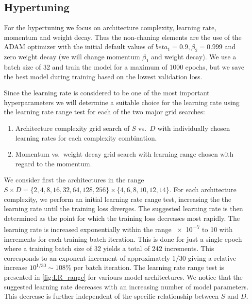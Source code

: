 \subsection{Hypertuning}
For the hypertuning we focus on architecture complexity, learning rate, momentum and weight decay. Thus the non-chaning elements are the use of the ADAM optimizer with the initial default values of $beta_1 = 0.9, \beta_2 = 0.999$ and zero weight decay (we will change momentum $\beta_1$ and weight decay). We use a batch size of 32 and train the model for a maximum of 1000 epochs, but we save the best model during training based on the lowest validation loss. 

Since the learning rate is considered to be one of the most important hyperparameters we will determine a suitable choice for the learning rate using the learning rate range test for each of the two major grid searches:
\begin{enumerate}
  \item Architecture complexity grid search of $S$ vs.\ $D$ with individually chosen learning rates for each complexity combination.
  \item Momentum vs.\ weight decay grid search with learning range chosen with regard to the momentum. 
\end{enumerate}
We consider first the architectures in the range $S \times D =
\{2,4,8,16,32,64,128,256\} \times \{4,6,8,10,12,14\}$. For each architecture
complexity, we perform an initial learning rate range test, increasing the
the learning rate until the training loss diverges. The suggested learning rate is then determined as the point for which the training loss decreases most rapidly. The learning rate is increased exponentially within the range \num{e-7} to 10 with increments for each training batch iteration. This is done for just a single epoch where a training batch size of 32 yields a total of 242 increments. This corresponds to an exponent increment of approximately $1/30$ giving a relative increase $10^{1/30} \sim 108\%$ per batch iteration. The learning rate range test is presented in \cref{fig:LR_range} for variours model architectures. We notice that the suggested learning rate decreases with an increasing number of model parameters. This decrease is further independent of the specific relationship between $S$ and $D$.

